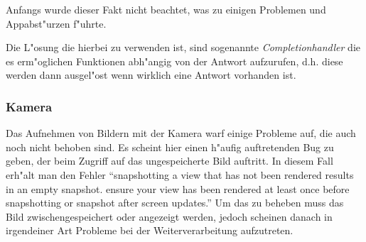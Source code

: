 Anfangs wurde dieser Fakt nicht beachtet, was zu einigen Problemen und Appabst"urzen f"uhrte. 

Die L"osung die hierbei zu verwenden ist, sind sogenannte \textit{Completionhandler} die es erm"oglichen Funktionen abh"angig von der Antwort aufzurufen, d.h. diese werden dann ausgel"ost wenn wirklich eine Antwort vorhanden ist.  

\subsubsection{Kamera}

Das Aufnehmen von Bildern mit der Kamera warf einige Probleme auf, die auch noch nicht behoben sind. Es scheint hier einen h"aufig auftretenden Bug zu geben, der beim Zugriff auf das ungespeicherte Bild auftritt. In diesem Fall erh"alt man den Fehler \enquote{snapshotting a view that has not been rendered results in an empty snapshot. ensure your view has been rendered at least once before snapshotting or snapshot after screen updates.}
Um das zu beheben muss das Bild zwischengespeichert oder angezeigt werden, jedoch scheinen danach in irgendeiner Art Probleme bei der Weiterverarbeitung aufzutreten. 


